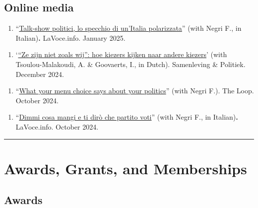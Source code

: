 \documentclass[10pt,]{article}
\providecommand{\tightlist}{%
  \setlength{\itemsep}{0pt}\setlength{\parskip}{0pt}}
\begin{document}
\subsection{Online media}\label{online-media}

\begin{enumerate}
\def\labelenumi{\arabic{enumi}.}
\setcounter{enumi}{3}
\tightlist
\item
  ``\href{https://lavoce.info/archives/106804/talk-show-politici-lo-specchio-di-unitalia-polarizzata/}{Talk-show
  politici, lo specchio di un'Italia polarizzata}'' (with Negri F., in
  Italian)\textbf{.} LaVoce.info. January 2025.
\end{enumerate}

\begin{enumerate}
\def\labelenumi{\arabic{enumi}.}
\setcounter{enumi}{2}
\tightlist
\item
  `\href{https://www.sampol.be/2024/12/ze-zijn-niet-zoals-wij-hoe-kiezers-kijken-naar-andere-kiezers}{``Ze
  zijn niet zoals wij'': hoe kiezers kijken naar andere kiezers}' (with
  Tsoulou-Malakoudi, A. \& Goovaerts, I., in Dutch). Samenleving \&
  Politiek. December 2024.
\end{enumerate}

\begin{enumerate}
\def\labelenumi{\arabic{enumi}.}
\setcounter{enumi}{1}
\tightlist
\item
  ``\href{https://theloop.ecpr.eu/what-your-menu-choice-says-about-your-politics/}{What
  your menu choice says about your politics}'' (with Negri F.). The
  Loop. October 2024.
\end{enumerate}

\begin{enumerate}
\def\labelenumi{\arabic{enumi}.}
\tightlist
\item
  ``\href{https://lavoce.info/archives/106171/dimmi-cosa-mangi-e-ti-diro-che-partito-voti/}{Dimmi
  cosa mangi e ti dirò che partito voti}'' (with Negri F., in
  Italian)\textbf{.} LaVoce.info. October 2024.
\end{enumerate}

\bigskip \hrule

\section{Awards, Grants, and
Memberships}\label{awards-grants-and-memberships}

\subsection{Awards}\label{awards}
\end{document}
